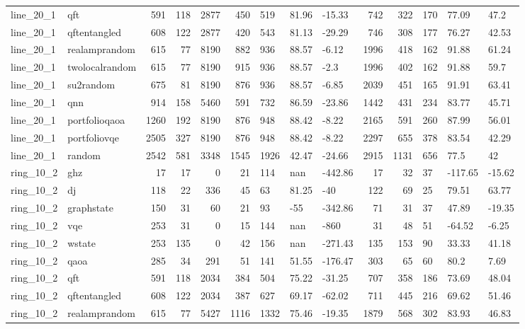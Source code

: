 \begin{longtable}{llrrrrlllrrlll}
line\_20\_1 & qft & 591 & 118 & 2877 & 450 & 519 & 81.96 & -15.33 & 742 & 322 & 170 & 77.09 & 47.2 \\
line\_20\_1 & qftentangled & 608 & 122 & 2877 & 420 & 543 & 81.13 & -29.29 & 746 & 308 & 177 & 76.27 & 42.53 \\
line\_20\_1 & realamprandom & 615 & 77 & 8190 & 882 & 936 & 88.57 & -6.12 & 1996 & 418 & 162 & 91.88 & 61.24 \\
line\_20\_1 & twolocalrandom & 615 & 77 & 8190 & 915 & 936 & 88.57 & -2.3 & 1996 & 402 & 162 & 91.88 & 59.7 \\
line\_20\_1 & su2random & 675 & 81 & 8190 & 876 & 936 & 88.57 & -6.85 & 2039 & 451 & 165 & 91.91 & 63.41 \\
line\_20\_1 & qnn & 914 & 158 & 5460 & 591 & 732 & 86.59 & -23.86 & 1442 & 431 & 234 & 83.77 & 45.71 \\
line\_20\_1 & portfolioqaoa & 1260 & 192 & 8190 & 876 & 948 & 88.42 & -8.22 & 2165 & 591 & 260 & 87.99 & 56.01 \\
line\_20\_1 & portfoliovqe & 2505 & 327 & 8190 & 876 & 948 & 88.42 & -8.22 & 2297 & 655 & 378 & 83.54 & 42.29 \\
line\_20\_1 & random & 2542 & 581 & 3348 & 1545 & 1926 & 42.47 & -24.66 & 2915 & 1131 & 656 & 77.5 & 42 \\
ring\_10\_2 & ghz & 17 & 17 & 0 & 21 & 114 & nan & -442.86 & 17 & 32 & 37 & -117.65 & -15.62 \\
ring\_10\_2 & dj & 118 & 22 & 336 & 45 & 63 & 81.25 & -40 & 122 & 69 & 25 & 79.51 & 63.77 \\
ring\_10\_2 & graphstate & 150 & 31 & 60 & 21 & 93 & -55 & -342.86 & 71 & 31 & 37 & 47.89 & -19.35 \\
ring\_10\_2 & vqe & 253 & 31 & 0 & 15 & 144 & nan & -860 & 31 & 48 & 51 & -64.52 & -6.25 \\
ring\_10\_2 & wstate & 253 & 135 & 0 & 42 & 156 & nan & -271.43 & 135 & 153 & 90 & 33.33 & 41.18 \\
ring\_10\_2 & qaoa & 285 & 34 & 291 & 51 & 141 & 51.55 & -176.47 & 303 & 65 & 60 & 80.2 & 7.69 \\
ring\_10\_2 & qft & 591 & 118 & 2034 & 384 & 504 & 75.22 & -31.25 & 707 & 358 & 186 & 73.69 & 48.04 \\
ring\_10\_2 & qftentangled & 608 & 122 & 2034 & 387 & 627 & 69.17 & -62.02 & 711 & 445 & 216 & 69.62 & 51.46 \\
ring\_10\_2 & realamprandom & 615 & 77 & 5427 & 1116 & 1332 & 75.46 & -19.35 & 1879 & 568 & 302 & 83.93 & 46.83 \\

\end{longtable}
